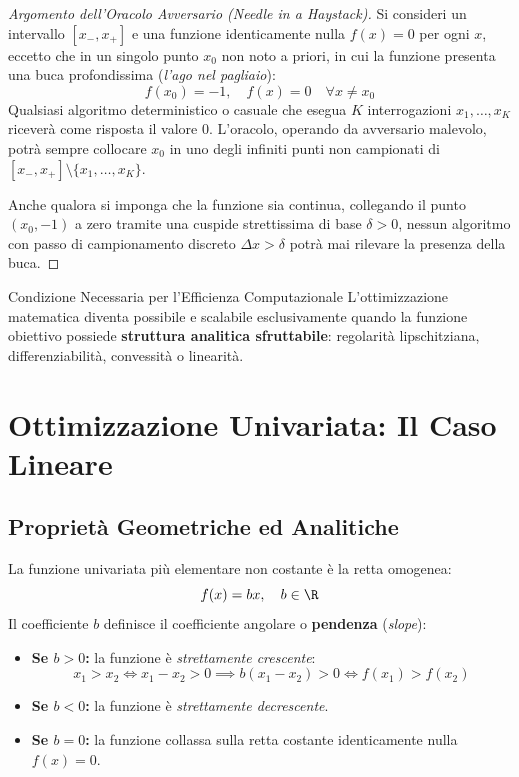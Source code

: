 \begin{proof}[Argomento dell'Oracolo Avversario (\textit{Needle in a Haystack})]
Si consideri un intervallo $[x_-, x_+]$ e una funzione identicamente nulla $f(x) = 0$ per ogni $x$, eccetto che in un singolo punto $x_0$ non noto a priori, in cui la funzione presenta una buca profondissima (\textit{l'ago nel pagliaio}):
\begin{equation}
f(x_0) = -1, \quad f(x) = 0 \quad \forall x \neq x_0
\end{equation}
Qualsiasi algoritmo deterministico o casuale che esegua $K$ interrogazioni $x_1, \dots, x_K$ ricever\`a come risposta il valore $0$. L'oracolo, operando da avversario malevolo, potr\`a sempre collocare $x_0$ in uno degli infiniti punti non campionati di $[x_-, x_+] \setminus \{x_1, \dots, x_K\}$.

Anche qualora si imponga che la funzione sia continua, collegando il punto $(x_0, -1)$ a zero tramite una cuspide strettissima di base $\delta > 0$, nessun algoritmo con passo di campionamento discreto $\Delta x > \delta$ potr\`a mai rilevare la presenza della buca.
\end{proof}

\begin{noteblock}{Condizione Necessaria per l'Efficienza Computazionale}
L'ottimizzazione matematica diventa possibile e scalabile esclusivamente quando la funzione obiettivo possiede \textbf{struttura analitica sfruttabile}: regolarit\`a lipschitziana, differenziabilit\`a, convessit\`a o linearit\`a.
\end{noteblock}


\FloatBarrier
\section{Ottimizzazione Univariata: Il Caso Lineare}
\label{sec:opt-caso-lineare}

\subsection{Propriet\`a Geometriche ed Analitiche}
La funzione univariata pi\`u elementare non costante \`e la retta omogenea:
\begin{equation}
f(x) = bx, \quad b \in \R
\end{equation}
Il coefficiente $b$ definisce il coefficiente angolare o \textbf{pendenza} (\textit{slope}):
\begin{itemize}
    \item \textbf{Se $b > 0$:} la funzione \`e \textit{strettamente crescente}:
    \begin{equation}
    x_1 > x_2 \iff x_1 - x_2 > 0 \implies b(x_1 - x_2) > 0 \iff f(x_1) > f(x_2)
    \end{equation}
    \item \textbf{Se $b < 0$:} la funzione \`e \textit{strettamente decrescente}.
    \item \textbf{Se $b = 0$:} la funzione collassa sulla retta costante identicamente nulla $f(x) = 0$.
\end{itemize}

